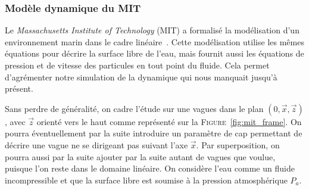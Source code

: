 			\subsubsection{Modèle dynamique du MIT}

				Le \textit{Massachusetts Institute of Technology} (\textsc{MIT}) a formalisé la modélisation d'un environnement marin dans le cadre linéaire~\cite{MIT_Waves}. Cette modélisation utilise les mêmes équations pour décrire la surface libre de l'eau, mais fournit aussi les équations de pression et de vitesse des particules en tout point du fluide. Cela permet d'agrémenter notre simulation de la dynamique qui nous manquait jusqu'à présent.

				Sans perdre de généralité, on cadre l'étude sur une vagues dans le plan $(0, \overrightarrow{x}, \overrightarrow{z})$, avec $\overrightarrow{z}$ orienté vers le haut comme représenté sur la \textsc{Figure}~\ref{fig:mit_frame}. On pourra éventuellement par la suite introduire un paramètre de cap permettant de décrire une vague ne se dirigeant pas suivant l'axe $\overrightarrow{x}$. Par superposition, on pourra aussi par la suite ajouter par la suite autant de vagues que voulue, puisque l'on reste dans le domaine linéaire. On considère l'eau comme un fluide incompressible et que la surface libre est soumise à la pression atmosphérique $P_a$.

